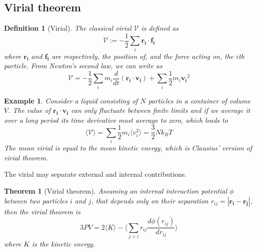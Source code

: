 \documentclass[a4paper]{article}
\newtheorem{eg}{Example}[section]
\theoremstyle{new}
\newtheorem{defi}{Definition}[section]
\newtheorem{thm}{Theorem}[section]
\begin{document}
\subsection{Virial theorem}
\begin{defi}[Virial]
The classical virial $\mathcal{V}$ is defined as
$$\mathcal{V}:=-\frac{1}{2}\sum_i\mathbf{r_i}\cdot\mathbf{f_i}$$
where $\mathbf{r_i}$ and $\mathbf{f_i}$ are respectively, the position of, and the force acting on, the $i$th particle. From Newton's second law, we can write as
\begin{equation}
\mathcal{V}=-\frac{1}{2}\sum_im_i\frac{d}{dt}(\mathbf{r_i}\cdot\mathbf{v_i})+\sum_i\frac{1}{2}m_i\mathbf{v_i}^2\label{virial}
\end{equation}
\end{defi}
\begin{eg}
Consider a liquid consisting of $N$ particles in a container of volume $V$. The value of $\mathbf{r_i}\cdot\mathbf{v_i}$ can only fluctuate between finite limits and if we average it over a long period its time derivative must average to zero, which leads to
$$\langle\mathcal{V}\rangle=\sum_i\frac{1}{2}m_i\langle v_i^2\rangle=\frac{3}{2}Nk_BT$$
The mean virial is equal to the mean kinetic energy, which is Clausius' version of virial theorem.
\end{eg}
The virial may separate external and internal contributions. 
\begin{thm}[Virial theorem]
Assuming an internal interaction potential $\phi$ between two particles $i$ and $j$, that depends only on their separation $r_{ij}=|\mathbf{r_i}-\mathbf{r_j}|$, then the virial theorem is
\begin{equation}
3PV=2\langle K\rangle-\bigg\langle\sum_{j>i}r_{ij}\frac{d\phi(r_{ij})}{dr_{ij}}\bigg\rangle\label{virialtheorem}
\end{equation}
where $K$ is the kinetic energy.
\end{thm}
\end{document}
